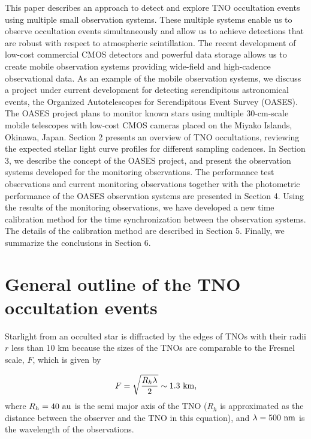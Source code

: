 \documentclass{pasj01}
\newcommand{\void}[1]{}
\renewcommand{\textcolor}{\void}
\begin{document}
This paper describes an approach to 
detect and explore TNO occultation events 
using multiple small observation systems.
These multiple systems enable us to observe occultation events 
simultaneously and allow us to achieve detections 
that are robust with respect to atmospheric scintillation. 
The recent development of low-cost commercial CMOS detectors and powerful data storage 
allows us to create mobile observation systems providing wide-field and high-cadence observational data.
As an example of the mobile observation systems, 
we discuss a project under current development for detecting serendipitous astronomical events,  
the Organized Autotelescopes for Serendipitous Event Survey (OASES).
The OASES project plans to monitor
known stars using multiple $30$-cm-scale mobile telescopes with 
low-cost CMOS cameras placed on the Miyako Islands, Okinawa, Japan.
Section 2 presents an overview of TNO occultations, 
reviewing the expected stellar light curve profiles for different sampling cadences.
In Section 3, we describe the concept of the OASES project,
and present the observation systems developed for the monitoring observations.
The performance test observations and current monitoring observations 
together with the photometric performance of the OASES observation systems
are presented in Section 4. 
Using the results of the monitoring observations, 
we have developed a new time calibration method for the 
time synchronization between the observation systems.
The details of the calibration method are described in Section 5.
Finally, we summarize the conclusions in Section 6.


\section{General outline of the TNO occultation events}
\label{section2}
Starlight from an occulted star is diffracted by the edges of TNOs
with their %
\textcolor{red}{
radii $r$
}
less than 10 km
because the sizes of the TNOs are comparable to the Fresnel scale, $F$, which is given by

\begin{eqnarray}
F  = \sqrt{\frac{R_h \lambda}{2}}  \sim 1.3 \ {\rm km},
\end{eqnarray}
where $R_h = 40 \ {\rm au}$ is the semi major axis of the TNO
($R_h$ is approximated as the distance between the observer and the TNO in this equation), 
and $\lambda = 500 \ {\rm nm}$ is the wavelength of the observations.
\end{document}

